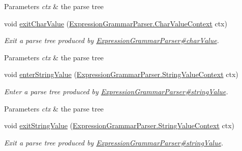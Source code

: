 \begin{DoxyCompactItemize}
\begin{DoxyCompactList}
\begin{DoxyParams}{Parameters}
{\em ctx} & the parse tree\\
\hline
\end{DoxyParams}
 \end{DoxyCompactList}\item 
void \hyperlink{classgov_1_1nasa_1_1jpf_1_1inspector_1_1server_1_1expression_1_1parser_1_1_expression_grammar_base_listener_a3ab9756fcc6bb360d86268424e1b234c}{exit\+Char\+Value} (\hyperlink{classgov_1_1nasa_1_1jpf_1_1inspector_1_1server_1_1expression_1_1parser_1_1_expression_grammar_parser_1_1_char_value_context}{Expression\+Grammar\+Parser.\+Char\+Value\+Context} ctx)
\begin{DoxyCompactList}\small\item\em Exit a parse tree produced by \hyperlink{classgov_1_1nasa_1_1jpf_1_1inspector_1_1server_1_1expression_1_1parser_1_1_expression_grammar_parser_ac136542b03653c7a98f0dbbea5b454e5}{Expression\+Grammar\+Parser\#char\+Value}.


\begin{DoxyParams}{Parameters}
{\em ctx} & the parse tree\\
\hline
\end{DoxyParams}
 \end{DoxyCompactList}\item 
void \hyperlink{classgov_1_1nasa_1_1jpf_1_1inspector_1_1server_1_1expression_1_1parser_1_1_expression_grammar_base_listener_a7c2a5ad18cae51f2f682eb8e388827b0}{enter\+String\+Value} (\hyperlink{classgov_1_1nasa_1_1jpf_1_1inspector_1_1server_1_1expression_1_1parser_1_1_expression_grammar_parser_1_1_string_value_context}{Expression\+Grammar\+Parser.\+String\+Value\+Context} ctx)
\begin{DoxyCompactList}\small\item\em Enter a parse tree produced by \hyperlink{classgov_1_1nasa_1_1jpf_1_1inspector_1_1server_1_1expression_1_1parser_1_1_expression_grammar_parser_a3be270304875abe7a903a0bd5d1b1e16}{Expression\+Grammar\+Parser\#string\+Value}.


\begin{DoxyParams}{Parameters}
{\em ctx} & the parse tree\\
\hline
\end{DoxyParams}
 \end{DoxyCompactList}\item 
void \hyperlink{classgov_1_1nasa_1_1jpf_1_1inspector_1_1server_1_1expression_1_1parser_1_1_expression_grammar_base_listener_a8768c8c2cb5215a29d178b1fb5d9b0cf}{exit\+String\+Value} (\hyperlink{classgov_1_1nasa_1_1jpf_1_1inspector_1_1server_1_1expression_1_1parser_1_1_expression_grammar_parser_1_1_string_value_context}{Expression\+Grammar\+Parser.\+String\+Value\+Context} ctx)
\begin{DoxyCompactList}\small\item\em Exit a parse tree produced by \hyperlink{classgov_1_1nasa_1_1jpf_1_1inspector_1_1server_1_1expression_1_1parser_1_1_expression_grammar_parser_a3be270304875abe7a903a0bd5d1b1e16}{Expression\+Grammar\+Parser\#string\+Value}.



\end{DoxyCompactList}
\end{DoxyCompactItemize}
